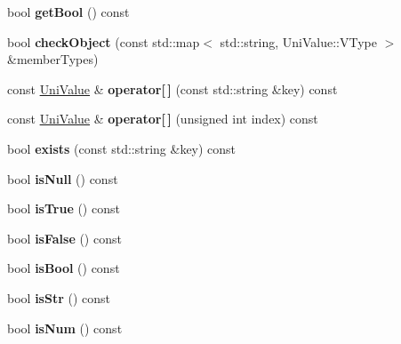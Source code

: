 \begin{DoxyCompactItemize}
bool {\bfseries get\+Bool} () const
\item 
\mbox{\label{class_uni_value_a2ec95a1ab26c60f471e2baef3ffa11ef}} 
bool {\bfseries check\+Object} (const std\+::map$<$ std\+::string, Uni\+Value\+::\+V\+Type $>$ \&member\+Types)
\item 
\mbox{\label{class_uni_value_a998b72bd7f758e01416e1b53eaa6d94c}} 
const \mbox{\hyperlink{class_uni_value}{Uni\+Value}} \& {\bfseries operator\mbox{[}$\,$\mbox{]}} (const std\+::string \&key) const
\item 
\mbox{\label{class_uni_value_a915422bee4d386f7028b9d08a836a2cb}} 
const \mbox{\hyperlink{class_uni_value}{Uni\+Value}} \& {\bfseries operator\mbox{[}$\,$\mbox{]}} (unsigned int index) const
\item 
\mbox{\label{class_uni_value_aad13d343dbda293251205e37d8b83c27}} 
bool {\bfseries exists} (const std\+::string \&key) const
\item 
\mbox{\label{class_uni_value_a3661be0f5580daceb23e5338e3a0df22}} 
bool {\bfseries is\+Null} () const
\item 
\mbox{\label{class_uni_value_a1491167609f899d0c7773749b5047969}} 
bool {\bfseries is\+True} () const
\item 
\mbox{\label{class_uni_value_ae79ab57378176379dd206c5e2d6f5feb}} 
bool {\bfseries is\+False} () const
\item 
\mbox{\label{class_uni_value_a97cbb7890d4a8c4b924ad5ffd7bc34c1}} 
bool {\bfseries is\+Bool} () const
\item 
\mbox{\label{class_uni_value_a8abe13a4663ccfda54ae2440ed445c5a}} 
bool {\bfseries is\+Str} () const
\item 
\mbox{\label{class_uni_value_ac5271a9bb4ece86f00052bb5603eaa78}} 
bool {\bfseries is\+Num} () const
\item 
\mbox{\label{class_uni_value_a1d2e9479d4fb330a73e0fd41197aec35}} 

\end{DoxyCompactItemize}
